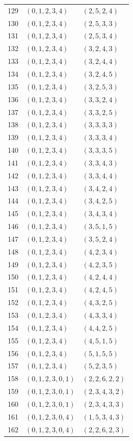 \documentclass[11pt,a4paper]{article}
\theoremstyle{definition}
\theoremstyle{remark}
\begin{document}
\begin{longtable}{rll}
129 & $(0,1,2,3,4)$ & $(2,5,2,4)$\\
130 & $(0,1,2,3,4)$ & $(2,5,3,3)$\\
131 & $(0,1,2,3,4)$ & $(2,5,3,4)$\\
132 & $(0,1,2,3,4)$ & $(3,2,4,3)$\\
133 & $(0,1,2,3,4)$ & $(3,2,4,4)$\\
134 & $(0,1,2,3,4)$ & $(3,2,4,5)$\\
135 & $(0,1,2,3,4)$ & $(3,2,5,3)$\\
136 & $(0,1,2,3,4)$ & $(3,3,2,4)$\\
137 & $(0,1,2,3,4)$ & $(3,3,2,5)$\\
138 & $(0,1,2,3,4)$ & $(3,3,3,3)$\\
139 & $(0,1,2,3,4)$ & $(3,3,3,4)$\\
140 & $(0,1,2,3,4)$ & $(3,3,3,5)$\\
141 & $(0,1,2,3,4)$ & $(3,3,4,3)$\\
142 & $(0,1,2,3,4)$ & $(3,3,4,4)$\\
143 & $(0,1,2,3,4)$ & $(3,4,2,4)$\\
144 & $(0,1,2,3,4)$ & $(3,4,2,5)$\\
145 & $(0,1,2,3,4)$ & $(3,4,3,4)$\\
146 & $(0,1,2,3,4)$ & $(3,5,1,5)$\\
147 & $(0,1,2,3,4)$ & $(3,5,2,4)$\\
148 & $(0,1,2,3,4)$ & $(4,2,3,4)$\\
149 & $(0,1,2,3,4)$ & $(4,2,3,5)$\\
150 & $(0,1,2,3,4)$ & $(4,2,4,4)$\\
151 & $(0,1,2,3,4)$ & $(4,2,4,5)$\\
152 & $(0,1,2,3,4)$ & $(4,3,2,5)$\\
153 & $(0,1,2,3,4)$ & $(4,3,3,4)$\\
154 & $(0,1,2,3,4)$ & $(4,4,2,5)$\\
155 & $(0,1,2,3,4)$ & $(4,5,1,5)$\\
156 & $(0,1,2,3,4)$ & $(5,1,5,5)$\\
157 & $(0,1,2,3,4)$ & $(5,2,3,5)$\\
158 & $(0,1,2,3,0,1)$ & $(2,2,6,2,2)$\\
159 & $(0,1,2,3,0,1)$ & $(2,3,4,3,2)$\\
160 & $(0,1,2,3,0,1)$ & $(2,3,4,3,3)$\\
161 & $(0,1,2,3,0,4)$ & $(1,5,3,4,3)$\\
162 & $(0,1,2,3,0,4)$ & $(2,2,6,2,3)$\\

\end{longtable}
\end{document}
